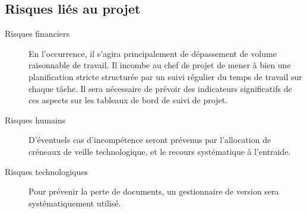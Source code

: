 \subsection{Risques liés au projet}

\begin{description}
    \item[Risques financiers] En l'occurrence, il s'agira principalement de
        dépassement de volume raisonnable de travail.  Il incombe au chef de
        projet de mener à bien une planification stricte structurée par un
        suivi régulier du temps de travail sur chaque tâche. Il sera nécessaire
        de prévoir des indicateurs significatifs de ces aspects sur les
        tableaux de bord de suivi de projet.
    \item[Risques humains] D'éventuels cas d'incompétence seront prévenus par
        l'allocation de créneaux de veille technologique, et le recours
        systématique à l'entraide.
    \item[Risques technologiques] Pour prévenir la perte de documents, un
        gestionnaire de version sera systématiquement utilisé.
\end{description}




